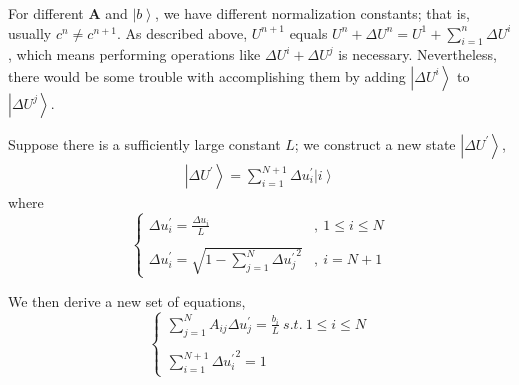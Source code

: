 \documentclass[%
 reprint,
 amsmath,amssymb,
pra,
]{revtex4-1}
\begin{document}
For different $\bm{A}$ and $\left|b\right\rangle$, we have different normalization constants; that is, usually $c^{n} \neq c^{n+1}$. As described above, $U^{n+1}$ equals $U^{n} + \Delta U^{n} = U^{1} + \sum_{i=1}^{n} \Delta U^{i}$, which means performing operations like $\Delta U^{i} + \Delta U^{j}$ is necessary. Nevertheless, there would be some trouble with accomplishing them by adding $\left|\Delta U^{i}\right\rangle$ to $\left|\Delta U^{j}\right\rangle$.

Suppose there is a sufficiently large constant $L$; we construct a new state $\left|\Delta U^{\prime}\right\rangle$,
\begin{align}
\left|\Delta U^{\prime}\right\rangle = \sum_{i=1}^{N+1}\Delta u_i^{\prime}\left|i\right\rangle
\end{align}
where
\begin{equation}
\left\{
\begin{array}{ll}
  \Delta u_i^{\prime} = \frac{\Delta u_i}{L}&,\ 1\leq i \leq N\\
  &\\
  \Delta u_i^{\prime} = \sqrt{1 - \sum_{j=1}^{N}{\Delta u_j^{\prime}}^2}&,\ i=N+1
\end{array}
\right.
\end{equation}

We then derive a new set of equations,
\begin{equation}\label{eq:Delta_u_prime_equations}
\left\{
\begin{array}{l}
  \sum_{j=1}^{N}A_{ij}\Delta u_j^{\prime} = \frac{b_i}{L} \ s.t. \ 1\leq i \leq N\\
  \\
  \sum_{i=1}^{N + 1}{\Delta u_i^{\prime}}^2 = 1
\end{array}
\right.
\end{equation}
\end{document}
